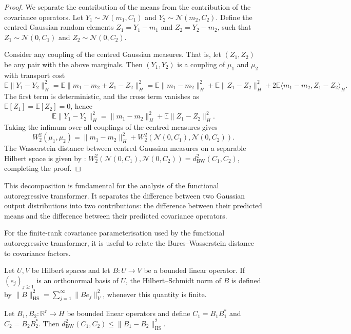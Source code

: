 \begin{proof}
We separate the contribution of the means from the contribution of the covariance operators. Let \(Y_1\sim\mathcal N(m_1,C_1)\) and \(Y_2\sim\mathcal N(m_2,C_2)\). Define the centred Gaussian random elements \(Z_1=Y_1-m_1\) and \(Z_2=Y_2-m_2\), such that \(Z_1\sim\mathcal N(0,C_1)\) and \(Z_2\sim\mathcal N(0,C_2).\)

Consider any coupling of the centred Gaussian measures. That is, let \((Z_1,Z_2)\) be any pair with the above marginals. Then \((Y_1,Y_2)\) is a coupling of \(\mu_1\) and \(\mu_2\) with transport cost
\[\mathbb E\lVert Y_1-Y_2\rVert_H^2=\mathbb E\lVert m_1-m_2+Z_1-Z_2\rVert_H^2 = \mathbb E\lVert m_1-m_2\rVert_H^2+\mathbb E\lVert Z_1-Z_2\rVert_H^2+2\mathbb E\langle m_1-m_2,Z_1-Z_2\rangle_H.\]
The first term is deterministic, and the cross term vanishes as \(\mathbb E[Z_1]=\mathbb E[Z_2]=0\), hence
\[\mathbb E\lVert Y_1-Y_2\rVert_H^2=\lVert m_1-m_2\rVert_H^2+\mathbb E\lVert Z_1-Z_2\rVert_H^2.\]
Taking the infimum over all couplings of the centred measures gives
\[W_2^2(\mu_1,\mu_2)=\lVert m_1-m_2\rVert_H^2+W_2^2(\mathcal N(0,C_1),\mathcal N(0,C_2)).\]
The Wasserstein distance between centred Gaussian measures on a separable Hilbert space is given by \cite{Gelbrich1990}: \(W_2^2(\mathcal N(0,C_1),\mathcal N(0,C_2))=d_{\mathrm{BW}}^2(C_1,C_2)\), completing the proof.
\end{proof}

This decomposition is fundamental for the analysis of the functional autoregressive transformer. It separates the difference between two Gaussian output distributions into two contributions: the difference between their predicted means and the difference between their predicted covariance operators.

For the finite-rank covariance parameterisation used by the functional autoregressive transformer, it is useful to relate the Bures--Wasserstein distance to covariance factors.

\begin{definition}\label{def:Hilbert--Schmidt norm}
Let \(U,V\) be Hilbert spaces and let \(B:U\to V\) be a bounded linear operator. If \((e_j)_{j\geqslant1}\) is an orthonormal basis of \(U\), the Hilbert--Schmidt norm of \(B\) is defined by \(\|B\|_{\mathrm{HS}}^2=\sum_{j=1}^{\infty}\|Be_j\|_V^2\), whenever this quantity is finite.
\end{definition}

\begin{proposition}\label{prop:Coupling bound for covariance factors}
Let \(B_1,B_2:\mathbb R^r\to H\) be bounded linear operators and define \(C_1=B_1B_1^*\) and \(C_2=B_2B_2^*\). Then \(d_{\mathrm{BW}}^2(C_1,C_2)\leqslant\|B_1-B_2\|_{\mathrm{HS}}^2\).
\end{proposition}

